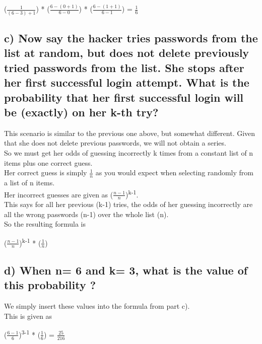 \documentclass{report}
\begin{document}
			\begin{center}
				($\frac{1}{(6-3)+1}$) * ($\frac{6-(0+1)}{6-0}$) * ($\frac{6-(1+1)}{6-1}$) = $\frac{1}{6}$
			\end{center}
		


		\subsection*{c) Now say the hacker tries passwords from the list at random, but does not delete previously tried passwords from the list. 
		She stops after her first successful login attempt. What is the probability that her first successful login will be (exactly) on her k-th try?}
			This scenario is similar to the previous one above, but somewhat different. Given that she does not delete previous passwords, we will not obtain a series.\\
			So we must get her odds of guessing incorrectly k times from a constant list of n items plus one correct guess.\\
			Her correct guess is simply $\frac{1}{n}$ as you would expect when selecting randomly from a list of n items.\\
			Her incorrect guesses are given as ($\frac{n-1}{n}$)\textsuperscript{k-1}.\\
			This says for all her previous (k-1) tries, the odds of her guessing incorrectly are all the wrong passwords (n-1) over the whole list (n).\\
			So the resulting formula is 

			\begin{center}
				($\frac{n-1}{n}$)\textsuperscript{k-1} * ($\frac{1}{n}$)
			\end{center}







		\subsection*{d) When n= 6 and k= 3, what is the value of this probability ? }
			We simply insert these values into the formula from part c).\\
			This is given as 

			\begin{center}
				($\frac{6-1}{6}$)\textsuperscript{3-1} * ($\frac{1}{6}$) = $\frac{25}{216}$
			\end{center}
\end{document}
